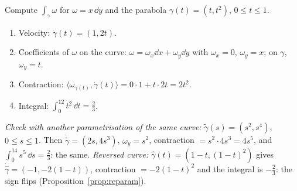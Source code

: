 \begin{example}\label{ex:lineint}
Compute $\int_\gamma\omega$ for $\omega=x\,\dd y$ and the parabola $\gamma(t)=(t,t^2)$, $0\le t\le1$.
\begin{enumerate}
\item Velocity: $\dot\gamma(t)=(1,2t)$.
\item Coefficients of $\omega$ on the curve: $\omega=\omega_x\dd x+\omega_y\dd y$ with $\omega_x=0$, $\omega_y=x$; on $\gamma$, $\omega_y=t$.
\item Contraction: $\langle\omega_{\gamma(t)},\dot\gamma(t)\rangle=0\cdot1+t\cdot2t=2t^2$.
\item Integral: $\int_0^12t^2\,\dd t=\frac23$.
\end{enumerate}
\emph{Check with another parametrisation of the same curve:} $\tilde\gamma(s)=(s^2,s^4)$, $0\le s\le1$. Then $\dot{\tilde\gamma}=(2s,4s^3)$, $\omega_y=s^2$, contraction $=s^2\cdot4s^3=4s^5$, and $\int_0^14s^5\,\dd s=\frac23$: the same.
\emph{Reversed curve:} $\hat\gamma(t)=(1-t,(1-t)^2)$ gives $\dot{\hat\gamma}=(-1,-2(1-t))$, contraction $=-2(1-t)^2$ and the integral is $-\frac23$: the sign flips (Proposition~\ref{prop:reparam}).
\end{example}
